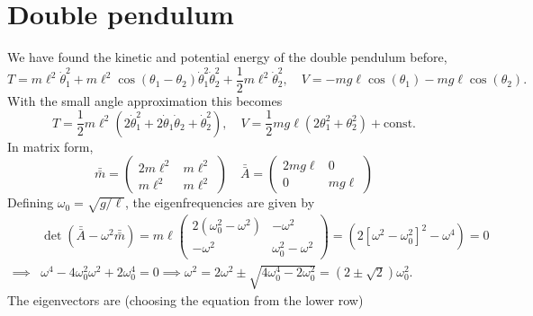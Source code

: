 \documentclass{article}
\begin{document}
    \section{Double pendulum}
        We have found the kinetic and potential energy of the double pendulum before,
        \begin{equation*}
            T = m\ell^2\dot \theta_1^2 + m \ell^2 \cos(\theta_1 - \theta_2)\dot \theta_1^2 \dot \theta_2^2 + \frac{1}{2}m \ell^2 \dot \theta_2^2, \quad
            V = -mg\ell \cos(\theta_1) - mg \ell \cos(\theta_2).
        \end{equation*}
        With the small angle approximation this becomes
        \begin{equation*}
            T = \frac{1}{2}m\ell^2\left(2\dot \theta_1^2 + 2\dot \theta_1 \dot \theta_2 + \dot \theta^2_2 \right), \quad
            V = \frac{1}{2}mg \ell \left(2\theta_1^2 + \theta_2^2\right) + \mathrm{const.}
        \end{equation*}
        In matrix form, 
        \begin{equation*}
            \bar {\bar m} = 
            \begin{pmatrix*}
                2m \ell^2 & m \ell^2 \\
                m \ell^2 & m \ell^2
            \end{pmatrix*}
            \quad
            \bar {\bar A} = 
            \begin{pmatrix*}
                2mg\ell & 0 \\
                0 & mg\ell
            \end{pmatrix*}
        \end{equation*}
        Defining $\omega_0 = \sqrt{g/\ell}$, the eigenfrequencies are given by
        \begin{align*}
            & \det(\bar {\bar A} - \omega^2 \bar {\bar m}) = m \ell
            \begin{pmatrix*}
                2(\omega_0^2 -\omega^2 ) & -\omega^2 \\
                -\omega^2 & \omega_0^2 - \omega^2
            \end{pmatrix*}
            = (2[\omega^2 - \omega_0^2]^2 - \omega^4) = 0 \\
            \implies & \omega^4 - 4 \omega_0^2 \omega^2 + 2\omega_0^4 = 0 \implies \omega^2 = 2\omega^2 \pm \sqrt{4\omega_0^4 - 2\omega_0^2} = \left(2 \pm \sqrt 2\right) \omega_0^2.
        \end{align*}
        The eigenvectors are (choosing the equation from the lower row)
\end{document}
